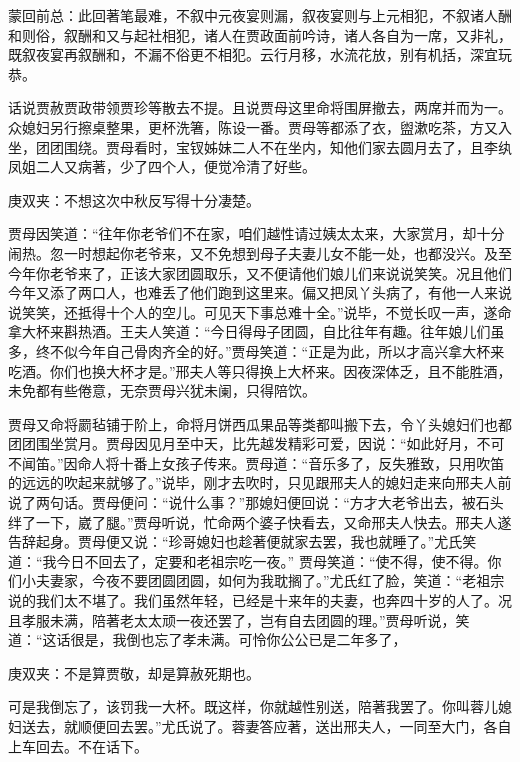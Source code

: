 
\begin{parag}
    \begin{note}蒙回前总：此回著笔最难，不叙中元夜宴则漏，叙夜宴则与上元相犯，不叙诸人酬和则俗，叙酬和又与起社相犯，诸人在贾政面前吟诗，诸人各自为一席，又非礼，既叙夜宴再叙酬和，不漏不俗更不相犯。云行月移，水流花放，别有机括，深宜玩恭。\end{note}
\end{parag}


\begin{parag}
    话说贾赦贾政带领贾珍等散去不提。且说贾母这里命将围屏撤去，两席并而为一。众媳妇另行擦桌整果，更杯洗箸，陈设一番。贾母等都添了衣，盥漱吃茶，方又入坐，团团围绕。贾母看时，宝钗姊妹二人不在坐内，知他们家去圆月去了，且李纨凤姐二人又病著，少了四个人，便觉冷清了好些。\begin{note}庚双夹：不想这次中秋反写得十分凄楚。\end{note}贾母因笑道：“往年你老爷们不在家，咱们越性请过姨太太来，大家赏月，却十分闹热。忽一时想起你老爷来，又不免想到母子夫妻儿女不能一处，也都没兴。及至今年你老爷来了，正该大家团圆取乐，又不便请他们娘儿们来说说笑笑。况且他们今年又添了两口人，也难丢了他们跑到这里来。偏又把凤丫头病了，有他一人来说说笑笑，还抵得十个人的空儿。可见天下事总难十全。”说毕，不觉长叹一声，遂命拿大杯来斟热酒。王夫人笑道：“今日得母子团圆，自比往年有趣。往年娘儿们虽多，终不似今年自己骨肉齐全的好。”贾母笑道：“正是为此，所以才高兴拿大杯来吃酒。你们也换大杯才是。”邢夫人等只得换上大杯来。因夜深体乏，且不能胜酒，未免都有些倦意，无奈贾母兴犹未阑，只得陪饮。
\end{parag}


\begin{parag}
    贾母又命将罽毡铺于阶上，命将月饼西瓜果品等类都叫搬下去，令丫头媳妇们也都团团围坐赏月。贾母因见月至中天，比先越发精彩可爱，因说：“如此好月，不可不闻笛。”因命人将十番上女孩子传来。贾母道：“音乐多了，反失雅致，只用吹笛的远远的吹起来就够了。”说毕，刚才去吹时，只见跟邢夫人的媳妇走来向邢夫人前说了两句话。贾母便问：“说什么事？”那媳妇便回说：“方才大老爷出去，被石头绊了一下，崴了腿。”贾母听说，忙命两个婆子快看去，又命邢夫人快去。邢夫人遂告辞起身。贾母便又说：“珍哥媳妇也趁著便就家去罢，我也就睡了。”尤氏笑道：“我今日不回去了，定要和老祖宗吃一夜。” 贾母笑道：“使不得，使不得。你们小夫妻家，今夜不要团圆团圆，如何为我耽搁了。”尤氏红了脸，笑道：“老祖宗说的我们太不堪了。我们虽然年轻，已经是十来年的夫妻，也奔四十岁的人了。况且孝服未满，陪著老太太顽一夜还罢了，岂有自去团圆的理。”贾母听说，笑道：“这话很是，我倒也忘了孝未满。可怜你公公已是二年多了，\begin{note}庚双夹：不是算贾敬，却是算赦死期也。\end{note}可是我倒忘了，该罚我一大杯。既这样，你就越性别送，陪著我罢了。你叫蓉儿媳妇送去，就顺便回去罢。”尤氏说了。蓉妻答应著，送出邢夫人，一同至大门，各自上车回去。不在话下。
\end{parag}


